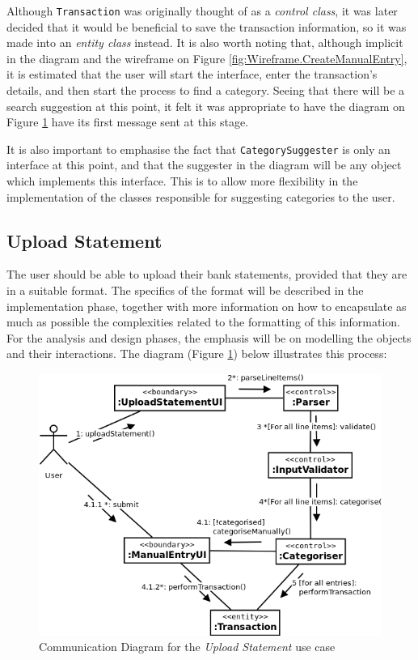 Although \texttt{Transaction} was originally thought of as a \emph{control
class}, it was later decided that it would be beneficial to save the
transaction information, so it was made into an \emph{entity class} instead.
It is also worth noting that, although implicit in the diagram and the
wireframe on Figure \ref{fig:Wireframe.CreateManualEntry}, it is estimated that
the user will start the interface, enter the transaction's details, and then
start the process to find a category. Seeing that there will be a search
suggestion at this point, it felt it was appropriate to have the diagram on
Figure \ref{fig:CommDiagram.CreateManualEntry} have its first message sent at
this stage.

It is also important to emphasise the fact that \texttt{CategorySuggester} is
only an interface at this point, and that the suggester in the diagram will be
any object which implements this interface. This is to allow more flexibility
in the implementation of the classes responsible for suggesting categories to
the user.

\subsection{Upload Statement} \label{sec:AnalysisAndDesign.UploadStatement}

The user should be able to upload their bank statements, provided that they are
in a suitable format. The specifics of the format will be described in the
implementation phase, together with more information on how to encapsulate as
much as possible the complexities related to the formatting of this
information.  For the analysis and design phases, the emphasis will be on
modelling the objects and their interactions. The diagram (Figure
\ref{fig:CommDiagram.CreateManualEntry}) below illustrates this process:
\begin{figure}[ht!]
  \begin{center}
    \includegraphics[width=14cm]{./contents/img/Comm_Diagram_-_Upload_Statement.png}
  \end{center}
  \caption{Communication Diagram for the \emph{Upload Statement} use case}
  \label{fig:CommDiagram.CreateManualEntry}
\end{figure}
\FloatBarrier

